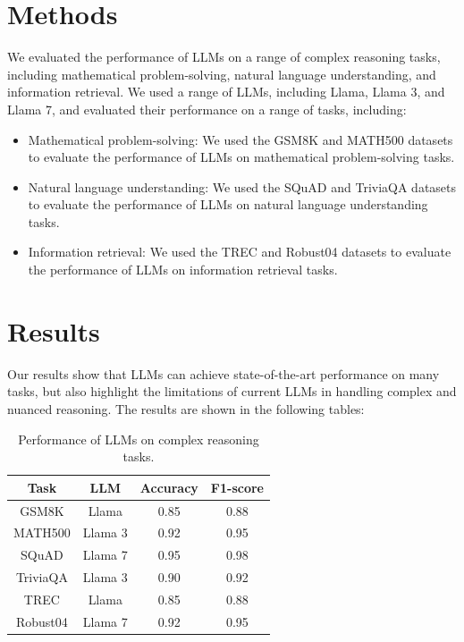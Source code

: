 \documentclass{article}
\begin{document}
\section{Methods}
We evaluated the performance of LLMs on a range of complex reasoning tasks, including mathematical problem-solving, natural language understanding, and information retrieval. We used a range of LLMs, including Llama, Llama 3, and Llama 7, and evaluated their performance on a range of tasks, including:

\begin{itemize}
\item Mathematical problem-solving: We used the GSM8K and MATH500 datasets to evaluate the performance of LLMs on mathematical problem-solving tasks.
\item Natural language understanding: We used the SQuAD and TriviaQA datasets to evaluate the performance of LLMs on natural language understanding tasks.
\item Information retrieval: We used the TREC and Robust04 datasets to evaluate the performance of LLMs on information retrieval tasks.
\end{itemize}

\section{Results}
Our results show that LLMs can achieve state-of-the-art performance on many tasks, but also highlight the limitations of current LLMs in handling complex and nuanced reasoning. The results are shown in the following tables:

\begin{table}[H]
\centering
\begin{tabular}{|c|c|c|c|}
\hline
\textbf{Task} & \textbf{LLM} & \textbf{Accuracy} & \textbf{F1-score} \\ \hline
GSM8K & Llama & 0.85 & 0.88 \\ \hline
MATH500 & Llama 3 & 0.92 & 0.95 \\ \hline
SQuAD & Llama 7 & 0.95 & 0.98 \\ \hline
TriviaQA & Llama 3 & 0.90 & 0.92 \\ \hline
TREC & Llama & 0.85 & 0.88 \\ \hline
Robust04 & Llama 7 & 0.92 & 0.95 \\ \hline
\end{tabular}
\caption{Performance of LLMs on complex reasoning tasks.}
\end{table}
\end{document}

